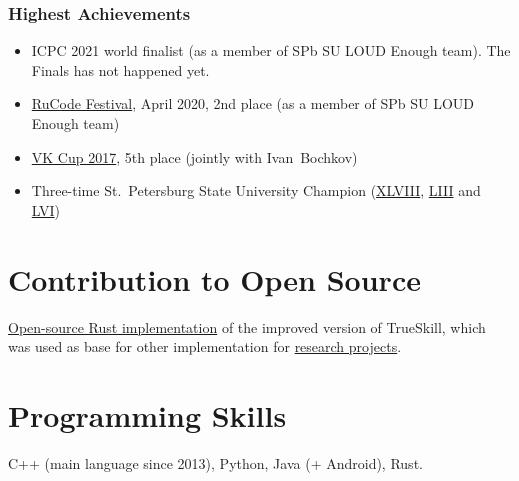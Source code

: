 \documentclass[a4paper, 11pt]{article}
\begin{document}
\subsubsection*{Highest Achievements}

\begin{itemize}
	\item ICPC 2021 world finalist (as a member of SPb SU LOUD Enough team). The Finals has not happened yet.

	\item \href{http://rucode.it-edu.mipt.ru/rucode2020resAB}{RuCode Festival}, April 2020, 2nd place (as a member of SPb SU LOUD Enough team)

	\item \href{https://codeforces.com/blog/entry/53192}{VK Cup 2017}, 5th place (jointly with Ivan~Bochkov)

	\item Three-time St.~Petersburg State University Champion (\href{https://acm.math.spbu.ru/cgi-bin/monitor.pl/n171015.dat}{XLVIII}, \href{https://acm.math.spbu.ru/cgi-bin/monitor.pl/n190421.dat}{LIII} and \href{https://acm.math.spbu.ru/cgi-bin/monitor.pl/n201206.dat}{LVI})
\end{itemize}

\section*{Contribution to Open Source}

\href{https://github.com/nikgaevoy/SPbTrueSkill}{Open-source Rust implementation} of the improved version of TrueSkill, which was used as base for other implementation for \href{https://arxiv.org/abs/2101.00400}{research projects}.

\section*{Programming Skills}

C++ (main language since 2013), Python, Java (+ Android), Rust.
\end{document}
